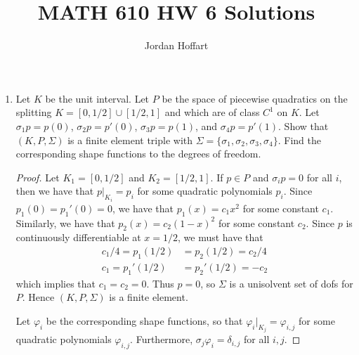 \documentclass{article}
\title{MATH 610 HW 6 Solutions}
\author{Jordan Hoffart}
\date{}
\begin{document}
\maketitle

\begin{enumerate}
	\item
	      Let $K$ be the unit interval.
	      Let $P$ be the space of piecewise quadratics on the splitting $K = [0,1/2] \cup [1/2,1]$ and which are of class $C^1$ on $K$.
	      Let $\sigma_1 p = p(0)$, $\sigma_2 p = p'(0)$, $\sigma_3 p = p(1)$, and $\sigma_4 p = p'(1)$.
	      Show that $(K,P,\Sigma)$ is a finite element triple with $\Sigma = \{\sigma_1,\sigma_2,\sigma_3,\sigma_4\}$.
	      Find the corresponding shape functions to the degrees of freedom.
	      \begin{proof}
		      Let $K_1 = [0,1/2]$ and $K_2 = [1/2,1]$.
		      If $p \in P$ and $\sigma_i p = 0$ for all $i$, then we have that $p|_{K_i} = p_i$ for some quadratic polynomials $p_i$.
		      Since $p_1(0) = p_1'(0) = 0$, we have that $p_1(x) = c_1x^2$ for some constant $c_1$.
		      Similarly, we have that $p_2(x) = c_2(1-x)^2$ for some constant $c_2$.
		      Since $p$ is continuously differentiable at $x = 1/2$, we must have that
		      \begin{align*}
			      c_1/4 = p_1(1/2) & = p_2(1/2) = c_2/4 \\
			      c_1 = p_1'(1/2)  & = p_2'(1/2) = -c_2
		      \end{align*}
		      which implies that $c_1 = c_2 = 0$.
		      Thus $p = 0$, so $\Sigma$ is a unisolvent set of dofs for $P$.
		      Hence $(K,P,\Sigma)$ is a finite element.

		      Let $\varphi_i$ be the corresponding shape functions, so that $\varphi_i|_{K_j} = \varphi_{i,j}$ for some quadratic polynomials $\varphi_{i,j}$.
		      Furthermore, $\sigma_j\varphi_i = \delta_{i,j}$ for all $i,j$.


\end{proof}
\end{enumerate}
\end{document}
